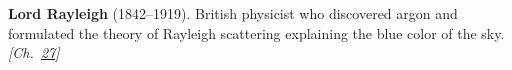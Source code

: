 \nobelphysics \textbf{Lord Rayleigh} (1842–1919). British physicist who discovered argon and formulated the theory of Rayleigh scattering explaining the blue color of the sky. \emph{[Ch.~\hyperref[ch:planetaryskycolors]{27}]}

